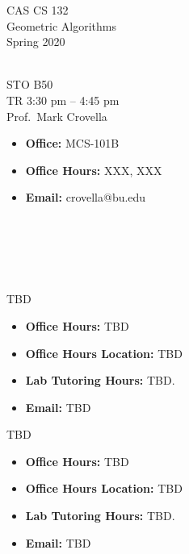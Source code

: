 \documentclass[11pt]{article}
\begin{document}
\sloppy 
\begin{center}
\LARGE CAS CS 132\\
\Large Geometric Algorithms\\
\Large\rm Spring 2020\\~\\
\end{center}

 STO B50\\[\baselineskip]
 TR 3:30 pm -- 4:45 pm 
\\[\baselineskip] 

 Prof.\ Mark Crovella\\[0.75\baselineskip]
\begin{minipage}[t]{0.60\textwidth}
\begin{itemize}
\item {\bf Office:} MCS-101B
\item {\bf Office Hours:} {\small XXX,  XXX}
\item {\bf Email:} crovella@bu.edu
\end{itemize}
\end{minipage}
~\\~\\~\\~\\
 \begin{minipage}[t]{0.60\textwidth}
  TBD 
 \begin{itemize}
 \item {\bf Office Hours:} {\small TBD}
 \item {\bf Office Hours Location:} TBD
 \item {\bf Lab Tutoring Hours:} {\small TBD.}
 \item {\bf Email:} TBD
 \end{itemize}
 \end{minipage}
 \begin{minipage}[t]{0.60\textwidth}
  TBD 
 \begin{itemize}
 \item {\bf Office Hours:} {\small TBD}
 \item {\bf Office Hours Location:} TBD
 \item {\bf Lab Tutoring Hours:} {\small TBD.}
 \item {\bf Email:} TBD
 \end{itemize}
 \end{minipage}
\end{document}
